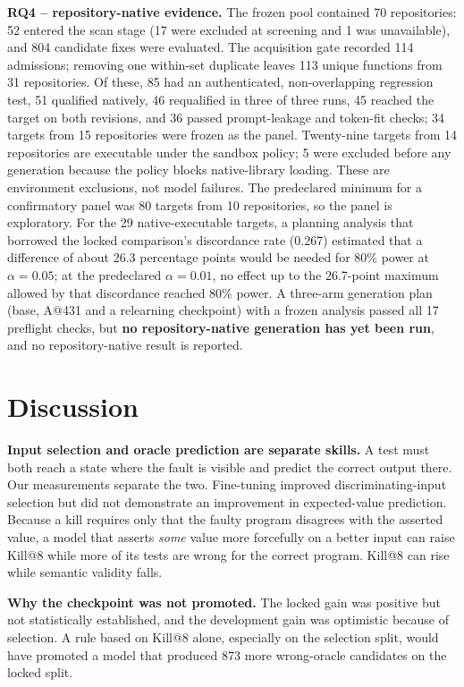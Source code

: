 \documentclass[10pt,conference,letterpaper]{IEEEtran}
\makeatletter
\newcommand{\killk}[1]{Kill@#1}
\makeatother
\begin{document}
\textbf{RQ4 -- repository-native evidence.} The frozen pool contained 70 repositories:
52 entered the scan stage (17 were excluded at screening and 1 was unavailable), and
804 candidate fixes were evaluated. The acquisition gate recorded 114 admissions;
removing one within-set duplicate leaves 113 unique functions from 31 repositories. Of
these, 85 had an authenticated, non-overlapping regression test, 51 qualified
natively, 46 requalified in three of three runs, 45 reached the target on both
revisions, and 36 passed prompt-leakage and token-fit checks; 34 targets from 15
repositories were frozen as the panel. Twenty-nine targets from 14 repositories are
executable under the sandbox policy; 5 were excluded before any generation because the
policy blocks native-library loading. These are environment exclusions, not model
failures. The predeclared minimum for a confirmatory panel was 80 targets from 10
repositories, so the panel is exploratory. For the 29 native-executable targets, a
planning analysis that borrowed the locked comparison's discordance rate (0.267)
estimated that a difference of about 26.3 percentage points would be needed for 80\%
power at $\alpha=0.05$; at the predeclared $\alpha=0.01$, no effect up to the
26.7-point maximum allowed by that discordance reached 80\% power. A three-arm
generation plan (base, A@431 and a relearning checkpoint) with a frozen analysis
passed all 17 preflight checks, but \textbf{no repository-native generation has yet
been run}, and no repository-native result is reported.

\section{Discussion}

\textbf{Input selection and oracle prediction are separate skills.} A test must both
reach a state where the fault is visible and predict the correct output there. Our
measurements separate the two. Fine-tuning improved discriminating-input selection but
did not demonstrate an improvement in expected-value prediction. Because a kill
requires only that the faulty program disagrees with the asserted value, a model that
asserts \emph{some} value more forcefully on a better input can raise \killk{8} while
more of its tests are wrong for the correct program. \killk{8} can rise while semantic
validity falls.

\textbf{Why the checkpoint was not promoted.} The locked gain was positive but not
statistically established, and the development gain was optimistic because of
selection. A rule based on \killk{8} alone, especially on the selection split, would
have promoted a model that produced 873 more wrong-oracle candidates on the locked
split.
\end{document}
